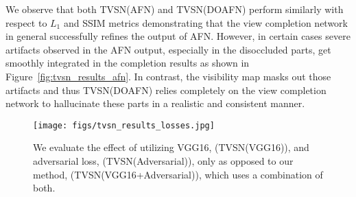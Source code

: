 \documentclass[10pt,twocolumn,letterpaper]{article}
\begin{document}
We observe that both TVSN(AFN) and TVSN(DOAFN) perform similarly with respect to $L_1$ and SSIM metrics demonstrating that the view completion network in general successfully refines the output of AFN. However, in certain cases severe artifacts observed in the AFN output, especially in the disoccluded parts, get smoothly integrated in the completion results as shown in Figure~\ref{fig:tvsn_results_afn}. In contrast, the visibility map masks out those artifacts and thus TVSN(DOAFN) relies completely on the view completion network to hallucinate these parts in a realistic and consistent manner.

\begin{figure}[t]
\vspace{-2mm}
\begin{center}
\texttt{[image: figs/tvsn\_results\_losses.jpg]}
\end{center}
\caption{We evaluate the effect of utilizing VGG16, (TVSN(VGG16)), and adversarial loss, (TVSN(Adversarial)), only as opposed to our method, (TVSN(VGG16+Adversarial)), which uses a combination of both.}
\label{fig:tvsn_results_losses}
\vspace{-3mm}
\end{figure}

%
\end{document}
